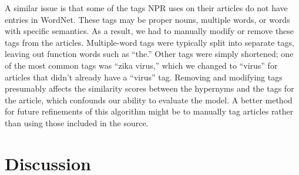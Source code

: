 \documentclass[12pt]{article}
\begin{document}
A similar issue is that some of the tags NPR uses on their articles do not have entries in WordNet. These tags may be proper nouns, multiple words, or words with specific semantics. As a result, we had to manually modify or remove these tags from the articles. Multiple-word tags were typically split into separate tags, leaving out function words such as ``the.'' Other tags were simply shortened; one of the most common tags was ``zika virus,'' which we changed to ``virus'' for articles that didn't already have a ``virus'' tag. Removing and modifying tags presumably affects the similarity scores between the hypernyms and the tags for the article, which confounds our ability to evaluate the model. A better method for future refinements of this algorithm might be to manually tag articles rather than using those included in the source.

\section{Discussion}



%
%


\end{document}
